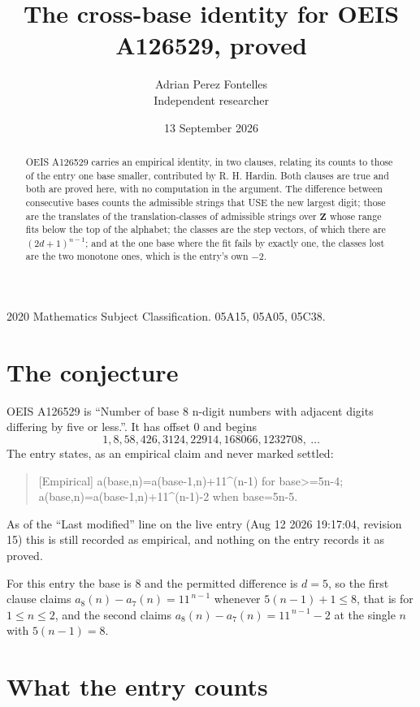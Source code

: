 \documentclass[11pt,a4paper]{article}
\title{The cross-base identity for OEIS A126529, proved}
\author{Adrian Perez Fontelles\\ \small Independent researcher}
\date{13 September 2026}
\theoremstyle{plain}
\theoremstyle{definition}
\begin{document}
\maketitle

\begin{abstract}
OEIS A126529 carries an empirical identity, in two clauses, relating its counts to those of the
entry one base smaller, contributed by R. H. Hardin. Both clauses are true and both are proved
here, with no computation in the argument. The difference between consecutive bases counts the
admissible strings that USE the new largest digit; those are the translates of the
translation-classes of admissible strings over $\mathbf{Z}$ whose range fits below the top of
the alphabet; the classes are the step vectors, of which there are $(2d+1)^{n-1}$; and at the
one base where the fit fails by exactly one, the classes lost are the two monotone ones, which
is the entry's own $-2$.
\end{abstract}

\noindent\small 2020 Mathematics Subject Classification. 05A15, 05A05, 05C38.\normalsize

\section{The conjecture}

OEIS A126529 is ``Number of base 8 n-digit numbers with adjacent digits differing by five or less.''. It has offset $0$ and begins
\[
1, 8, 58, 426, 3124, 22914, 168066, 1232708,\ \dots
\]
The entry states, as an empirical claim and never marked settled:
\begin{quote}
[Empirical] a(base,n)=a(base-1,n)+11\textasciicircum{}(n-1) for base>=5n-4; a(base,n)=a(base-1,n)+11\textasciicircum{}(n-1)-2 when base=5n-5.
\end{quote}
As of the ``Last modified'' line on the live entry (Aug 12 2026 19:17:04, revision 15)
this is still recorded as empirical, and nothing on the entry records it as proved.

For this entry the base is $8$ and the permitted difference is $d=5$, so the first clause
claims $a_{8}(n)-a_{7}(n)=11^{\,n-1}$ whenever $5(n-1)+1\le8$, that is for
$1\le n\le2$, and the second claims $a_{8}(n)-a_{7}(n)=11^{\,n-1}-2$ at the single
$n$ with $5(n-1)=8$.

\section{What the entry counts}
\end{document}
